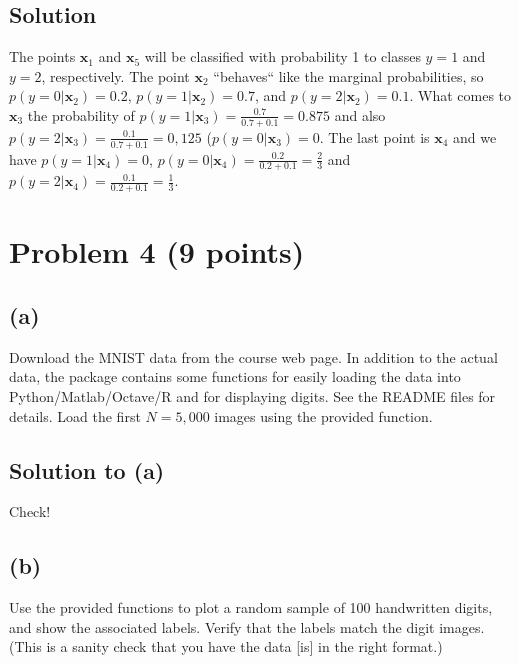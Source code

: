 \documentclass[10pt]{article}
\begin{document}
\subsection*{Solution}
The points $\mathbf{x}_1$ and $\mathbf{x}_5$ will be classified with probability 1 to classes $y = 1$ and $y = 2$, respectively. The point $\mathbf{x}_2$ ``behaves`` like the marginal probabilities, so $p(y = 0 | \mathbf{x}_2) = 0.2$, $p(y = 1 | \mathbf{x}_2) = 0.7$, and $p(y = 2 | \mathbf{x}_2) = 0.1$. What comes to $\mathbf{x}_3$ the probability of $p(y = 1 | \mathbf{x}_3) = \frac{0.7}{0.7 + 0.1} = 0.875$ and also $p(y = 2 | \mathbf{x}_3 )= \frac{0.1}{0.7 + 0.1} = 0,125$ ($p(y = 0 | \mathbf{x}_3) = 0$. The last point is $\mathbf{x}_4$ and we have $p(y = 1 | \mathbf{x}_4) = 0$, $p(y = 0 | \mathbf{x}_4) = \frac{0.2}{0.2 + 0.1} = \frac{2}{3}$ and $p(y = 2 | \mathbf{x}_4) = \frac{0.1}{0.2 + 0.1} = \frac{1}{3}$.

\section*{Problem 4 (9 points)}
\subsection*{(a)}
\color{blue}
Download the MNIST data from the course web page. In addition to the actual data, the package contains some functions for easily loading the data into Python/Matlab/Octave/R and for displaying digits. See the README files for details. Load the first $N=5,000$ images using the provided function.
\color{black}

\subsection*{Solution to (a)} 
Check!

\subsection*{(b)}
\color{blue}
Use the provided functions to plot a random sample of 100 handwritten digits, and show the associated labels. Verify that the labels match the digit images. (This is a sanity check that you have the data [is] in the right format.)
\color{black}
\end{document}
